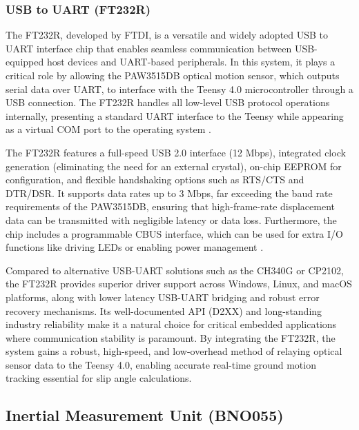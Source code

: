 \documentclass[12pt]{article}
\begin{document}
            \subsubsection{USB to UART (FT232R)}
                
                The FT232R, developed by FTDI, is a versatile and widely adopted USB to UART interface chip that enables seamless communication between USB-equipped host 
                devices and UART-based peripherals. In this system, it plays a critical role by allowing the PAW3515DB optical motion sensor, which outputs serial data 
                over UART, to interface with the Teensy 4.0 microcontroller through a USB connection. The FT232R handles all low-level USB protocol operations internally, 
                presenting a standard UART interface to the Teensy while appearing as a virtual COM port to the operating system \autocite{FTDIChip}.

                The FT232R features a full-speed USB 2.0 interface (12 Mbps), integrated clock generation (eliminating the need for an external crystal), on-chip EEPROM for 
                configuration, and flexible handshaking options such as RTS/CTS and DTR/DSR. It supports data rates up to 3 Mbps, far exceeding the baud rate requirements 
                of the PAW3515DB, ensuring that high-frame-rate displacement data can be transmitted with negligible latency or data loss. Furthermore, the chip includes 
                a programmable CBUS interface, which can be used for extra I/O functions like driving LEDs or enabling power management \autocite{FTDIChip}.

                Compared to alternative USB-UART solutions such as the CH340G or CP2102, the FT232R provides superior driver support across Windows, Linux, and macOS platforms, 
                along with lower latency USB-UART bridging and robust error recovery mechanisms. Its well-documented API (D2XX) and long-standing industry reliability make 
                it a natural choice for critical embedded applications where communication stability is paramount. By integrating the FT232R, the system gains a robust, 
                high-speed, and low-overhead method of relaying optical sensor data to the Teensy 4.0, enabling accurate real-time ground motion tracking essential for 
                slip angle calculations.

        \subsection{Inertial Measurement Unit (BNO055)}
\end{document}
